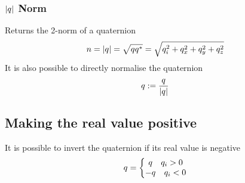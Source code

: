 \subsubsection*{$|{q_{}}|$ Norm}
Returns the 2-norm of a quaternion
\begin{equation}
n = |{q_{}}| = \sqrt{q_{}q_{}^*} = \sqrt{q_{i}^2 + q_{x}^2 + q_{y}^2 + q_{z}^2}
\end{equation}
It is also possible to directly normalise the quaternion
\begin{equation}
q_{} := \frac{q_{}}{|{q_{}}|}
\end{equation}

\subsection*{Making the real value positive}
It is possible to invert the quaternion if its real value is negative
\begin{equation}
q_{} = \left\lbrace \begin{matrix}
q_{} \quad q_{i}>0 \\
-q_{} \quad q_{i}<0
\end{matrix} \right.
\end{equation}
